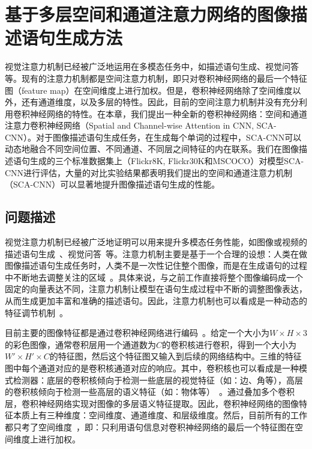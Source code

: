 \chapter{基于多层空间和通道注意力网络的图像描述语句生成方法}

视觉注意力机制已经被广泛地运用在多模态任务中，如描述语句生成、视觉问答等。现有的注意力机制都是空间注意力机制，即只对卷积神经网络的最后一个特征图（feature map）在空间维度上进行加权。但是，卷积神经网络除了空间维度以外，还有通道维度，以及多层的特性。因此，目前的空间注意力机制并没有充分利用卷积神经网络的特性。在本章，我们提出一种全新的卷积神经网络：空间和通道注意力卷积神经网络（Spatial and Channel-wise Attention in CNN, SCA-CNN）。对于图像描述语句生成任务，在生成每个单词的过程中，SCA-CNN可以动态地融合不同空间位置、不同通道、不同层之间特征的内在联系。我们在图像描述语句生成的三个标准数据集上（Flickr8K, Flickr30K和MSCOCO）对模型SCA-CNN进行评估，大量的对比实验结果都表明我们提出的空间和通道注意力机制（SCA-CNN）可以显著地提升图像描述语句生成的性能。


\section{问题描述}

视觉注意力机制已经被广泛地证明可以用来提升多模态任务性能，如图像或视频的描述语句生成~\cite{xu2015show,yao2015describing}、视觉问答~\cite{chen2016abc,yang2016stacked,xu2016ask}等。注意力机制主要是基于一个合理的设想：人类在做图像描述语句生成任务时，人类不是一次性记住整个图像，而是在生成语句的过程中不断地去调整关注的区域~\cite{corbetta2002control}。具体来说，与之前工作直接将整个图像编码成一个固定的向量表达不同，注意力机制让模型在语句生成过程中不断的调整图像表达，从而生成更加丰富和准确的描述语句。因此，注意力机制也可以看成是一种动态的特征调节机制~\cite{mnih2014recurrent,stollenga2014deep}。

目前主要的图像特征都是通过卷积神经网络进行编码~\cite{he2016deep,simonyan2015very}。给定一个大小为$W\times H\times 3$的彩色图像，通常卷积层用一个通道数为$C$的卷积核进行卷积，得到一个大小为$W'\times H'\times C$的特征图，然后这个特征图又输入到后续的网络结构中。三维的特征图中每个通道对应的是卷积核通道对应的响应。其中，卷积核也可以看成是一种模式检测器：底层的卷积核倾向于检测一些底层的视觉特征（如：边、角等），高层的卷积核倾向于检测一些高层的语义特征（如：物体等）~\cite{zeiler2014visualizing}。通过叠加多个卷积层，卷积神经网络实现对图像的多层语义特征提取。因此，卷积神经网络的图像特征本质上有三种维度：空间维度、通道维度、和层级维度。然后，目前所有的工作都只考了空间维度~\cite{xu2015show}，即：只利用语句信息对卷积神经网络的最后一个特征图在空间维度上进行加权。


